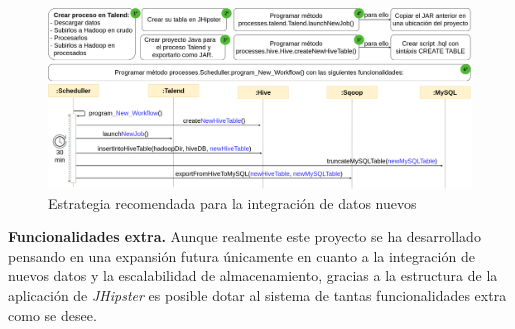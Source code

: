 \begin{figure}[!h]
    \centering
    \includegraphics[width=\textwidth,height=\textheight,keepaspectratio]{Imagenes/expansion}
    \caption{Estrategia recomendada para la integración de datos nuevos}
    \label{fig:expansion}
\end{figure}
\textbf{Funcionalidades extra.} Aunque realmente este proyecto se ha desarrollado pensando en una expansión futura únicamente en cuanto a la integración de nuevos datos y la escalabilidad de almacenamiento, gracias a la estructura de la aplicación de \textit{JHipster} es posible dotar al sistema de tantas funcionalidades extra como se desee. 

